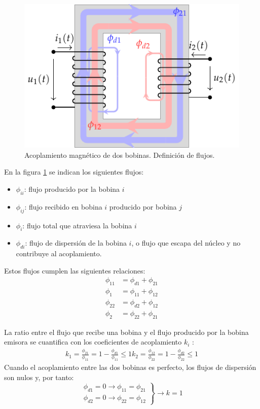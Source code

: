 \begin{figure}
  \centering
  \includegraphics[height=0.2\textheight]{../figs/acoplamientoTikz.pdf}
    \caption{Acoplamiento magnético de dos bobinas. Definición de flujos.}
  \label{fig:acoplamiento}
\end{figure}

En la figura \ref{fig:acoplamiento} se indican los siguientes flujos:
\begin{itemize}
\item   $\phi_{ii}$: flujo producido por la bobina $i$
\item   $\phi_{ij}$: flujo recibido en bobina $i$ producido por bobina $j$
\item   $\phi_{i}$: flujo total que atraviesa la bobina $i$
\item   $\phi_{di}$: flujo de dispersión de la bobina $i$, o flujo que escapa del núcleo y no contribuye al acoplamiento.
\end{itemize}

Estos flujos cumplen las siguientes relaciones:
\begin{align*}
  \phi_{11} &= \phi_{d1} + \phi_{21}\\
  \phi_{1} &= \phi_{11} + \phi_{12}\\
  \phi_{22} &= \phi_{d2} + \phi_{12}\\
  \phi_{2} &= \phi_{22} + \phi_{21}
\end{align*}

La ratio entre el flujo que recibe una bobina y el flujo producido por la bobina emisora se cuantifica con los coeficientes de acoplamiento $k_i$ :
\begin{align}
  \label{eq:coefs-acoplamiento}
  k_1 = \frac{\phi_{21}}{\phi_{11}} = 1 - \frac{\phi_{d1}}{\phi_{11}} \leq 1
  k_2 = \frac{\phi_{12}}{\phi_{22}} = 1 - \frac{\phi_{d2}}{\phi_{22}} \leq 1
\end{align}
Cuando el acoplamiento entre las dos bobinas es perfecto, los flujos de dispersión son nulos y, por tanto:
\[\left.
\begin{array}{cc}
  \phi_{d1} = 0 \rightarrow   \phi_{11} = \phi_{21}\\
  \phi_{d2} = 0 \rightarrow \phi_{22} = \phi_{12} 
  \end{array} \right\} \rightarrow k = 1
\]

